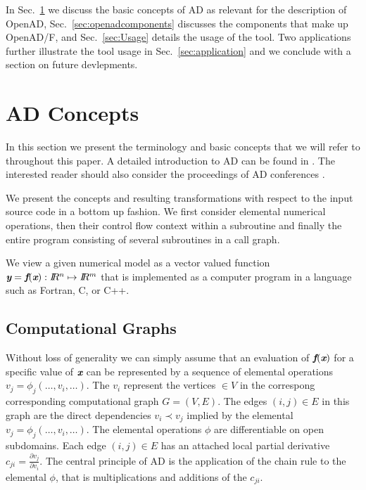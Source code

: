 \documentclass[11pt]{article}
\newcommand{\OpenADF}{OpenAD/F}
\newcommand{\OpenAD}{OpenAD}
\newcommand{\R}{I\!\!R}
\newcommand{\bmf}{\mbox{\bf\em f}}
\newcommand{\bmx}{\mbox{\bf\em x}}
\newcommand{\bmy}{\mbox{\bf\em y}}
\newcommand{\refsec}[1]{{Sec.~\ref{#1}}}
\begin{document}
In \refsec{sec:ADIntro} we discuss the basic concepts of AD as relevant for 
the description of \OpenAD, \refsec{sec:openadcomponents} discusses the components 
that make up \OpenADF, and \refsec{sec:Usage} details the usage of the tool. 
Two applications further illustrate the tool usage in \refsec{sec:application} and 
we conclude with a section on future devlepments.

\section{AD Concepts}\label{sec:ADIntro}

In this section we present the terminology and basic concepts that 
we will refer to throughout this paper. 
A detailed introduction to AD can be found in \cite{Gri00}.
The interested reader should also consider the proceedings of AD 
conferences \cite{CG91,BBCG96,CFG+01,BCH+05}.

We present the concepts and resulting transformations 
with respect to the input source code 
in a bottom up fashion.  
We first consider elemental numerical operations, 
then their control flow context within a subroutine and finally the entire program 
consisting of several subroutines in a call graph. 

We view a given numerical model as a 
vector valued function $\bmy=\bmf(\bmx): \R^n\mapsto \R^m$ that is implemented 
as a computer program in a language such as Fortran, C, or C++. 

\subsection{Computational Graphs} \label{ssec:computationalGraphs}

Without loss of generality we can simply assume that an evaluation of $\bmf(\bmx)$ for  
a specific value of $\bmx$ can be represented by a sequence of 
elemental operations $v_j=\phi_j(\ldots,v_i,\ldots)$. 
The $v_i$ represent the vertices $\in V$ in the correspong corresponding computational 
graph $G=(V,E)$. The edges $(i,j)\in E$ in this graph are the direct dependencies 
$v_i\prec v_j$ implied by the elemental $v_j=\phi_j(\ldots,v_i,\ldots)$.
The elemental operations $\phi$ are differentiable on open subdomains. 
Each edge $(i,j)\in E$ has an attached local partial derivative 
$c_{ji}=\frac{\partial v_j}{\partial v_i}$. 
The central principle of AD is 
the application of the chain rule to the elemental $\phi$, that is 
multiplications and additions of the  $c_{ji}$.  
\end{document}
